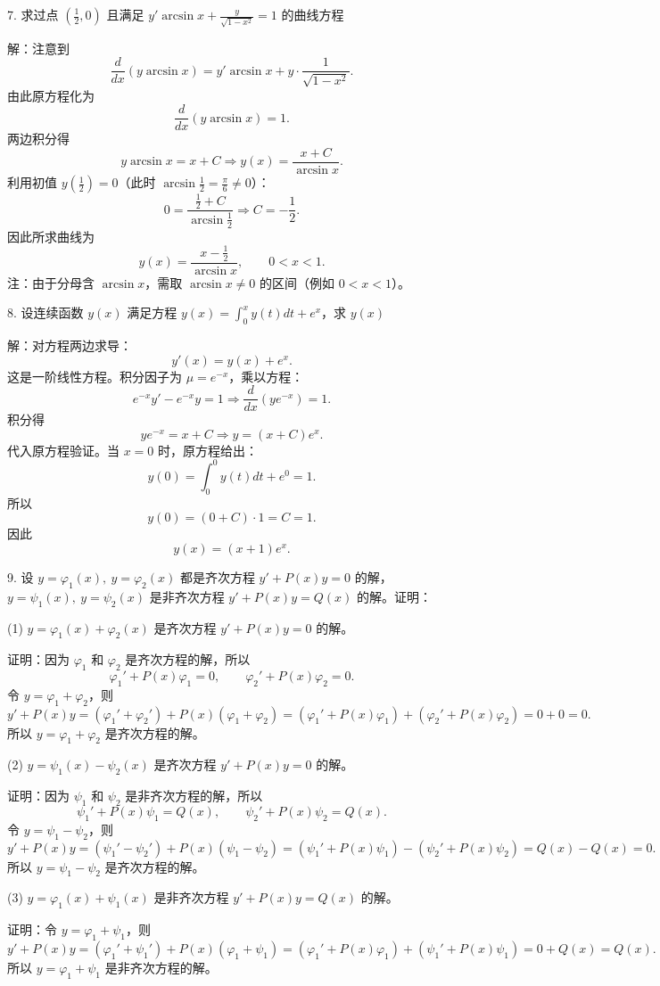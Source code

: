 7. 求过点 \(\left(\frac{1}{2},0\right)\) 且满足 \(y'\arcsin x+\frac{y}{\sqrt{1-x^{2}}}=1\) 的曲线方程

解：注意到
\[ \frac{d}{dx}\left(y\arcsin x\right)=y'\arcsin x+y\cdot\frac{1}{\sqrt{1-x^{2}}}. \]
由此原方程化为
\[ \frac{d}{dx}\left(y\arcsin x\right)=1. \]
两边积分得
\[ y\arcsin x=x+C\Longrightarrow y(x)=\frac{x+C}{\arcsin x}. \]
利用初值 \(y\left(\frac{1}{2}\right)=0\)（此时 \(\arcsin\frac{1}{2}=\frac{\pi}{6}\ne0\)）：
\[ 0=\frac{\frac{1}{2}+C}{\arcsin\frac{1}{2}}\Rightarrow C=-\frac{1}{2}. \]
因此所求曲线为
\[ y(x)=\frac{x-\frac{1}{2}}{\arcsin x},\qquad0<x<1. \]
注：由于分母含 \(\arcsin x\)，需取 \(\arcsin x\ne0\) 的区间（例如 \(0<x<1\)）。

8. 设连续函数 \(y(x)\) 满足方程 \(y(x)=\int_{0}^{x}y(t)dt+e^{x}\)，求 \(y(x)\)

解：对方程两边求导：
\[ y'(x)=y(x)+e^{x}. \]
这是一阶线性方程。积分因子为 \(\mu=e^{-x}\)，乘以方程：
\[ e^{-x}y'-e^{-x}y=1\Rightarrow\frac{d}{dx}\left(ye^{-x}\right)=1. \]
积分得
\[ ye^{-x}=x+C\Rightarrow y=(x+C)e^{x}. \]
代入原方程验证。当 \(x=0\) 时，原方程给出：
\[ y(0)=\int_{0}^{0}y(t)dt+e^{0}=1. \]
所以
\[ y(0)=(0+C)\cdot1=C=1. \]
因此
\[ y(x)=(x+1)e^{x}. \]

9. 设 \(y=\varphi_{1}(x),\ y=\varphi_{2}(x)\) 都是齐次方程 \(y'+P(x)y=0\) 的解，\(y=\psi_{1}(x),\ y=\psi_{2}(x)\) 是非齐次方程 \(y'+P(x)y=Q(x)\) 的解。证明：

(1) \(y=\varphi_{1}(x)+\varphi_{2}(x)\) 是齐次方程 \(y'+P(x)y=0\) 的解。

证明：因为 \(\varphi_{1}\) 和 \(\varphi_{2}\) 是齐次方程的解，所以
\[ \varphi_{1}'+P(x)\varphi_{1}=0,\qquad\varphi_{2}'+P(x)\varphi_{2}=0. \]
令 \(y=\varphi_{1}+\varphi_{2}\)，则
\[ y'+P(x)y=(\varphi_{1}'+\varphi_{2}')+P(x)(\varphi_{1}+\varphi_{2})=\left(\varphi_{1}'+P(x)\varphi_{1}\right)+\left(\varphi_{2}'+P(x)\varphi_{2}\right)=0+0=0. \]
所以 \(y=\varphi_{1}+\varphi_{2}\) 是齐次方程的解。

(2) \(y=\psi_{1}(x)-\psi_{2}(x)\) 是齐次方程 \(y'+P(x)y=0\) 的解。

证明：因为 \(\psi_{1}\) 和 \(\psi_{2}\) 是非齐次方程的解，所以
\[ \psi_{1}'+P(x)\psi_{1}=Q(x),\qquad\psi_{2}'+P(x)\psi_{2}=Q(x). \]
令 \(y=\psi_{1}-\psi_{2}\)，则
\[ y'+P(x)y=(\psi_{1}'-\psi_{2}')+P(x)(\psi_{1}-\psi_{2})=\left(\psi_{1}'+P(x)\psi_{1}\right)-\left(\psi_{2}'+P(x)\psi_{2}\right)=Q(x)-Q(x)=0. \]
所以 \(y=\psi_{1}-\psi_{2}\) 是齐次方程的解。

(3) \(y=\varphi_{1}(x)+\psi_{1}(x)\) 是非齐次方程 \(y'+P(x)y=Q(x)\) 的解。

证明：令 \(y=\varphi_{1}+\psi_{1}\)，则
\[ y'+P(x)y=(\varphi_{1}'+\psi_{1}')+P(x)(\varphi_{1}+\psi_{1})=\left(\varphi_{1}'+P(x)\varphi_{1}\right)+\left(\psi_{1}'+P(x)\psi_{1}\right)=0+Q(x)=Q(x). \]
所以 \(y=\varphi_{1}+\psi_{1}\) 是非齐次方程的解。
